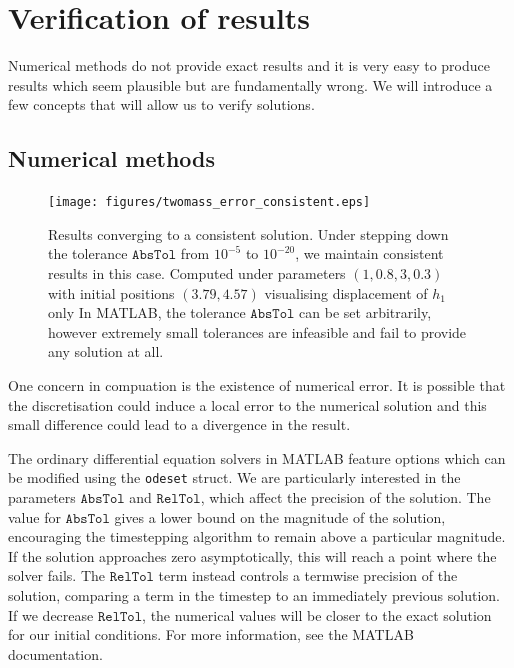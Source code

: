 \section{Verification of results}

Numerical methods do not provide exact results and it is very easy to produce results which seem plausible but are fundamentally wrong.
We will introduce a few concepts that will allow us to verify solutions.

\subsection{Numerical methods}

\begin{figure}[h!]
    \centering
    \texttt{[image: figures/twomass\_error\_consistent.eps]}
    \caption{
        Results converging to a consistent solution.
        Under stepping down the tolerance \(\mathtt{AbsTol}\) from $10^{-5}$ to $10^{-20}$,
        we maintain consistent results in this case.
        Computed under parameters \((1, 0.8, 3, 0.3)\) with initial positions \((3.79, 4.57)\) visualising displacement of $h_1$ only
        In MATLAB, the tolerance $\mathtt{AbsTol}$ can be set arbitrarily,
        however extremely small tolerances are infeasible and fail to provide any solution at all.
    }
    \label{fig:twomass_stepping_convergence}
\end{figure}

One concern in compuation is the existence of numerical error.
It is possible that the discretisation could induce a local error to the numerical solution and this small difference could lead to a divergence in the result.

The ordinary differential equation solvers in MATLAB feature options which can be modified using the \texttt{odeset} struct.
We are particularly interested in the parameters $\mathtt{AbsTol}$ and $\mathtt{RelTol}$,
which affect the precision of the solution.
The value for $\mathtt{AbsTol}$ gives a lower bound on the magnitude of the solution,
encouraging the timestepping algorithm to remain above a particular magnitude.
If the solution approaches zero asymptotically,
this will reach a point where the solver fails.
The $\mathtt{RelTol}$ term instead controls a termwise precision of the solution,
comparing a term in the timestep to an immediately previous solution.
If we decrease $\mathtt{RelTol}$,
the numerical values will be closer to the exact solution for our initial conditions.
For more information, see the MATLAB documentation. %

